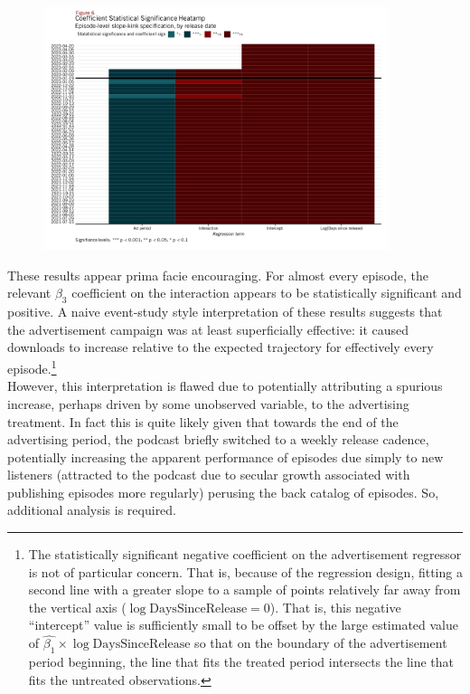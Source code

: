\documentclass[11pt, letterpaper, twoside]{article}
\begin{document}
\begin{figure}
  \centering
  \includegraphics[width=0.9\textwidth]{figures/daily_kink_sig_heatmap.png}
  \caption{}
  \label{fig:kink-ols-heatmap}
\end{figure}

These results appear prima facie encouraging. For almost every episode, the relevant $\beta_3$ coefficient on the interaction appears to be statistically significant and positive. A naive event-study style interpretation of these results suggests that the advertisement campaign was at least superficially effective: it caused downloads to increase relative to the expected trajectory for effectively every episode.\footnote{The statistically significant negative coefficient on the advertisement regressor is not of particular concern. That is, because of the regression design, fitting a second line with a greater slope to a sample of points relatively far away from the vertical axis ($\log \text{DaysSinceRelease}=0$). That is, this negative ``intercept'' value is sufficiently small to be offset by the large estimated value of $\hat{\beta_1}\times\log\text{DaysSinceRelease}$ so that on the boundary of the advertisement period beginning, the line that fits the treated period intersects the line that fits the untreated observations.} \\

However, this interpretation is flawed due to potentially attributing a spurious increase, perhaps driven by some unobserved variable, to the advertising treatment. In fact this is quite likely given that towards the end of the advertising period, the podcast briefly switched to a weekly release cadence, potentially increasing the apparent performance of episodes due simply to new listeners (attracted to the podcast due to secular growth associated with publishing episodes more regularly) perusing the back catalog of episodes. So, additional analysis is required.
\end{document}
